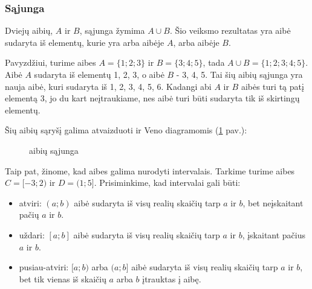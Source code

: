 \documentclass[a4paper]{article}
\def\firstcircle{(0,0) circle (1.5cm)}
\def\secondcircle{(0:2cm) circle (1.5cm)}
\begin{document}
\subsubsection{Sąjunga}

Dviejų aibių, $A$ ir $B$, sąjunga žymima $A \cup B$. Šio veiksmo rezultatas yra
aibė sudaryta iš elementų, kurie yra arba aibėje $A$, arba aibėje $B$.

Pavyzdžiui, turime aibes $A=\{1;2;3\}$ ir  $B=\{3;4;5\}$, tada $A \cup B =
      \{1;2;3;4;5\}$. Aibė $A$ sudaryta iš elementų 1, 2, 3, o aibė $B$ - 3, 4,
5. Tai šių aibių sąjunga yra nauja aibė, kuri sudaryta iš 1, 2, 3, 4, 5, 6.
Kadangi abi $A$ ir $B$ aibės turi tą patį elementą 3, jo du kart neįtraukiame,
nes aibė turi būti sudaryta tik iš skirtingų elementų.

Šių aibių sąryšį galima atvaizduoti ir Veno diagramomis
(\ref{fig:set_union} pav.):

\begin{figure}[!htbp]
      \centering
      \caption{aibių sąjunga} \label{fig:set_union}
\end{figure}

Taip pat, žinome, kad aibes galima nurodyti intervalais. Tarkime turime aibes
$C=[-3;2)$ ir $D=(1;5]$. Prisiminkime, kad intervalai gali būti:
\begin{itemize}
      \item atviri: $(a;b)$ aibė sudaryta iš visų realių skaičių tarp $a$ ir
            $b$, bet neįskaitant pačių $a$ ir $b$.
      \item uždari: $[a;b]$ aibė sudaryta iš visų realių skaičių tarp $a$ ir
            $b$, įskaitant pačius $a$ ir $b$.
      \item pusiau-atviri: $[a;b)$ arba $(a;b]$ aibė sudaryta iš visų realių
            skaičių tarp $a$ ir $b$, bet tik vienas iš skaičių $a$ arba $b$
            įtrauktas į
            aibę.
\end{itemize}
\end{document}
